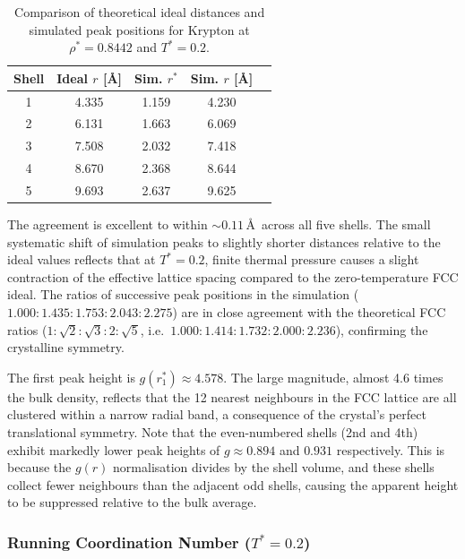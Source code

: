 \begin{table}[H]
    \centering
    \begin{tabular}{ccccc}
        \toprule
        \textbf{Shell} & \textbf{Ideal $r$ [\AA]} & \textbf{Sim. $r^*$} & \textbf{Sim. $r$ [\AA]} \\
        \midrule
        1 & 4.335 & 1.159 & 4.230 \\
        2 & 6.131 & 1.663 & 6.069 \\
        3 & 7.508 & 2.032 & 7.418 \\
        4 & 8.670 & 2.368 & 8.644 \\
        5 & 9.693 & 2.637 & 9.625 \\
        \bottomrule
    \end{tabular}
    \caption{\small Comparison of theoretical ideal distances and simulated peak positions for Krypton at $\rho^* = 0.8442$ and $T^* = 0.2$.}
    \label{tab:fcc_peaks}
\end{table}

The agreement is excellent to within $\sim 0.11$\,\AA\ across all five shells. The small systematic shift of simulation peaks to slightly shorter distances relative to the ideal values reflects that at $T^* = 0.2$, finite thermal pressure causes a slight contraction of the effective lattice spacing compared to the zero-temperature FCC ideal. The ratios of successive peak positions in the simulation ($1.000 : 1.435 : 1.753 : 2.043 : 2.275$) are in close agreement with the theoretical FCC ratios ($1 : \sqrt{2} : \sqrt{3} : 2 : \sqrt{5}$, i.e.\ $1.000 : 1.414 : 1.732 : 2.000 : 2.236$), confirming the crystalline symmetry.

The first peak height is $g(r^*_1) \approx 4.578$. The large magnitude, almost 4.6 times the bulk density, reflects that the 12 nearest neighbours in the FCC lattice are all clustered within a narrow radial band, a consequence of the crystal's perfect translational symmetry. Note that the even-numbered shells (2nd and 4th) exhibit markedly lower peak heights of $g \approx 0.894$ and $0.931$ respectively. This is because the $g(r)$ normalisation divides by the shell volume, and these shells collect fewer neighbours than the adjacent odd shells, causing the apparent height to be suppressed relative to the bulk average.

\subsubsection{Running Coordination Number ($T^* = 0.2$)}

